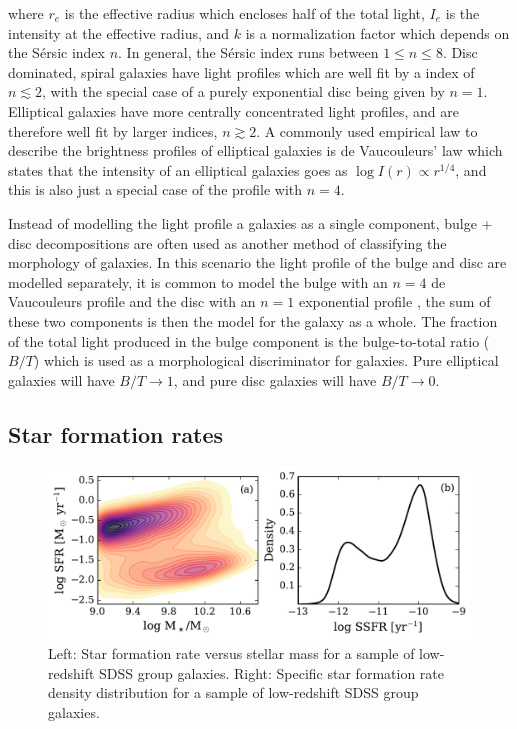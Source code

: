 \noindent
where $r_e$ is the effective radius which encloses half of the total
light, $I_e$ is the intensity at the effective radius, and $k$ is a
normalization factor which depends on the S{\'e}rsic index $n$.  In
general, the S{\'e}rsic index runs between $1 \le n \le 8$.  Disc
dominated, spiral galaxies have light profiles which are well fit by a
\ser index of $n \lesssim 2$, with the special case of a purely
exponential disc being given by $n=1$.  Elliptical galaxies have more
centrally concentrated light profiles, and are therefore well fit by
larger \ser indices, $n \gtrsim 2$.  A commonly used empirical law to
describe the brightness profiles of elliptical galaxies is de
Vaucouleurs' law which states that the intensity of an elliptical
galaxies goes as $\log I(r) \propto r^{1/4}$, and this is also just a
special case of the \ser profile with $n=4$.
\par
Instead of modelling the light profile a galaxies as a single
component, bulge + disc decompositions are often used as another
method of classifying the morphology of galaxies.  In this scenario
the light profile of the bulge and disc are modelled separately, it is
common to model the bulge with an $n=4$ de Vaucouleurs profile and the
disc with an $n=1$ exponential profile \citep[e.g.][]{simard2002}, the
sum of these two
components is then the model for the galaxy as a whole.  The fraction
of the total light produced in the bulge component is the bulge-to-total ratio
($B/T$) which is used as a morphological discriminator for galaxies.
Pure elliptical galaxies will have $B/T \to 1$, and pure disc galaxies
will have $B/T \to 0$.  

\subsection{Star formation rates}
\label{sec:sfr}

\begin{figure}[!ht]
  \centering
  \includegraphics[width=\textwidth]{m_sfr.pdf}
  \caption{Left: Star formation rate versus stellar mass for a sample
    of low-redshift SDSS group galaxies.  Right: Specific star
    formation rate density distribution for a sample of low-redshift
    SDSS group galaxies.}
  \label{fig:m_sfr}
\end{figure}

